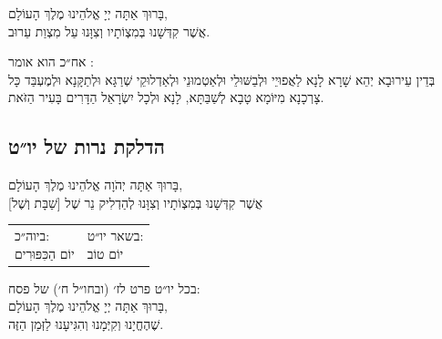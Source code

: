 \documentclass[11pt,twoside]{article}
\newcommand{\instruction}[1]{%
\ifhmode\else\noindent\fi%
{\plain\tiny{#1}}%
}
\begin{document}
{\centering\Large%
בָּרוּךְ אַתָּה יְיָ אֱלֹהֵינוּ מֶלֶךְ הָעוֹלָם,\\
אֲשֶׁר קִדְּשָׁנוּ בְּמִצְוֹתָיו וְצִוָּנוּ עַל מִצְוַת עֵרוּב.\par
}

\instruction{אח״כ הוא אומר%
:}\\
בְּדֵין עֵירוּבָא יְהֵא שָׁרָא לָנָא לַאֲפוּיֵי וּלְבַשּׁוּלֵי וּלְאַטְמוּנֵי וּלְאַדְלוּקֵי שְׁרַגָּא וּלְתַקָּנָא
וּלְמֶעְבַּד כָּל צָרְכָנָא מִיּוֹמָא טָבָא לְשַׁבַּתָּא, לָנָא וּלְכָל יִשְׂרָאֵל הַדָּרִים בָּעִיר הַזֹּאת.


\subsection{הדלקת נרות של יו״ט}

{\centering%
בָּרוּךְ אַתָּה יְהֹוָה אֱלֹהֵינוּ מֶלֶךְ הָעוֹלָם,\\
אֲשֶׁר קִדְּשָׁנוּ בְּמִצְוֹתָיו וְצִוָּנוּ לְהַדְלִיק נֵר שֶׁל
[שַׁבָּת וְשֶׁל]\par
}
\vspace{-\parskip}%
\begin{tabularx}{\textwidth}{XX}
  \makecell{\instruction{ביוה״כ:}\\יוֹם הַכִּפּוּרִים} &
  \makecell{\instruction{בשאר יו״ט:}\\יוֹם טוֹב} \\
\end{tabularx}

{\centering\Large%
\instruction{בכל יו״ט פרט לז׳ (ובחו״ל ח׳) של פסח:}\\
בָּרוּךְ אַתָּה יְיָ אֱלֹהֵינוּ מֶלֶךְ הָעוֹלָם,\\
שֶׁהֶחֱיָנוּ וְקִיְּמָנוּ וְהִגִּיעָנוּ לַזְּמַן הַזֶּה.\par
}

\newpage
\end{document}
